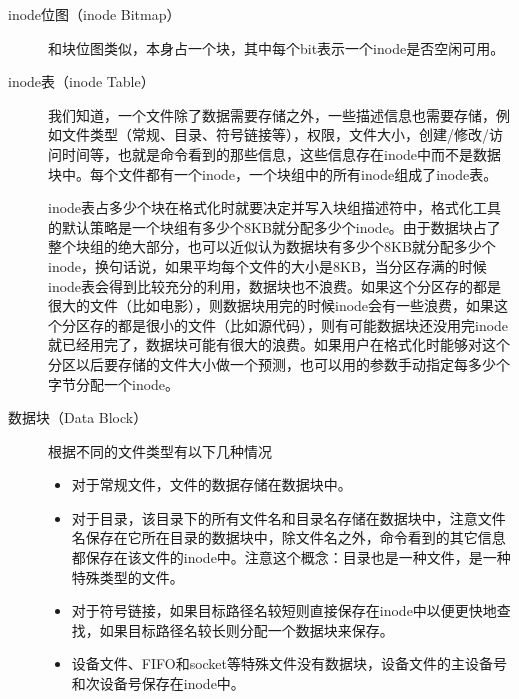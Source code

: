 \begin{description}
\item[{inode位图（inode Bitmap）}]


和块位图类似，本身占一个块，其中每个bit表示一个inode是否空闲可用。

\item[{inode表（inode Table）}]


我们知道，一个文件除了数据需要存储之外，一些描述信息也需要存储，例如文件类型（常规、目录、符号链接等），权限，文件大小，创建/修改/访问时间等，也就是命令看到的那些信息，这些信息存在inode中而不是数据块中。每个文件都有一个inode，一个块组中的所有inode组成了inode表。



inode表占多少个块在格式化时就要决定并写入块组描述符中，格式化工具的默认策略是一个块组有多少个8KB就分配多少个inode。由于数据块占了整个块组的绝大部分，也可以近似认为数据块有多少个8KB就分配多少个inode，换句话说，如果平均每个文件的大小是8KB，当分区存满的时候inode表会得到比较充分的利用，数据块也不浪费。如果这个分区存的都是很大的文件（比如电影），则数据块用完的时候inode会有一些浪费，如果这个分区存的都是很小的文件（比如源代码），则有可能数据块还没用完inode就已经用完了，数据块可能有很大的浪费。如果用户在格式化时能够对这个分区以后要存储的文件大小做一个预测，也可以用的参数手动指定每多少个字节分配一个inode。

\item[{数据块（Data Block）}]


根据不同的文件类型有以下几种情况


\begin{itemize}

\item 对于常规文件，文件的数据存储在数据块中。

\item 对于目录，该目录下的所有文件名和目录名存储在数据块中，注意文件名保存在它所在目录的数据块中，除文件名之外，命令看到的其它信息都保存在该文件的inode中。注意这个概念：目录也是一种文件，是一种特殊类型的文件。

\item 对于符号链接，如果目标路径名较短则直接保存在inode中以便更快地查找，如果目标路径名较长则分配一个数据块来保存。

\item 设备文件、FIFO和socket等特殊文件没有数据块，设备文件的主设备号和次设备号保存在inode中。
\end{itemize}

\end{description}


